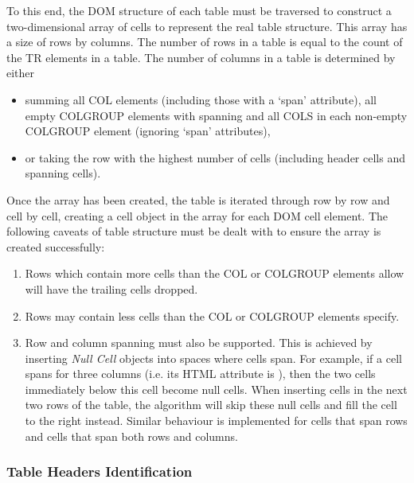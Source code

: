 To this end, the DOM structure of each table must be traversed to construct a
two-dimensional array of cells to represent the real table structure. This
array has a size of rows by columns. The number of rows in a table is equal to
the count of the TR elements in a table. The number of columns in a table is
determined by either

\begin{itemize}

\item summing all COL elements (including those with a `span' attribute), all
empty COLGROUP elements with spanning and all COLS in each non-empty
COLGROUP element (ignoring `span' attributes),

\item or taking the row with the highest number of cells (including header
cells and spanning cells).

\end{itemize}

Once the array has been created, the table is iterated through row by row and
cell by cell, creating a cell object in the array for each DOM cell element. 
The following caveats of table structure must be dealt with to ensure 
the array is created successfully:

\begin{enumerate}

\item Rows which contain more cells than the COL or COLGROUP elements allow
will have the trailing cells dropped.

\item Rows may contain less cells than the COL or COLGROUP elements specify.

\item Row and column spanning must also be supported. This is achieved by
inserting \emph{Null Cell} objects into spaces where cells span. For example,
if a cell spans for three columns (i.e. its HTML attribute is
), then the two cells immediately below this cell become null
cells. When inserting cells in the next two rows of the table, the algorithm
will skip these null cells and fill the cell to the right instead. Similar
behaviour is implemented for cells that span rows and cells that span both rows
and columns.

\end{enumerate}

\subsubsection{Table Headers Identification}

